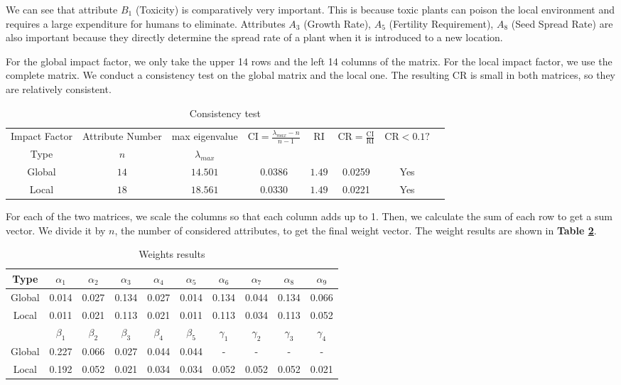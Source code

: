 \documentclass[12pt]{article}
\begin{document}
		We can see that attribute $B_1$ (Toxicity) is comparatively very important.  This is because toxic plants can poison the local environment and requires a large expenditure for humans to eliminate.  Attributes $A_3$ (Growth Rate), $A_5$ (Fertility Requirement), $A_8$ (Seed Spread Rate) are also important because they directly determine the spread rate of a plant when it is introduced to a new location.  
		
		For the global impact factor, we only take the upper 14 rows and the left 14 columns of the matrix.  For the local impact factor, we use the complete matrix.  We conduct a consistency test on the global matrix and the local one.  The resulting CR is small in both matrices, so they are relatively consistent.
		
		{
			\fontsize{10}{14}\selectfont
			{
				\begin{longtable}{cccccccc}
					\caption{Consistency test}
					\label{tb:consistency}\\
					
					\toprule
					Impact Factor&Attribute Number&max eigenvalue 
					&\multirow{2}{*}{$\mathrm{CI}=\displaystyle \frac{\lambda_{max}-n}{n-1}$}
					&\multirow{2}{*}{$\mathrm{RI}$}
					&\multirow{2}{*}{$\mathrm{CR}=\displaystyle \frac{\mathrm{CI}}{\mathrm{RI}}$}
					&\multirow{2}{*}{$\mathrm{CR}<0.1?$}\\
					Type&$n$&$\lambda_{max}$\\
					\toprule
					Global&$14$&$14.501$&$0.0386$&$1.49$&0.0259&Yes\\
					Local&$18$&$18.561$&$0.0330$&$1.49$&0.0221&Yes\\
					\bottomrule
				\end{longtable}
			}
		}	
		
		For each of the two matrices, we scale the columns so that each column adds up to 1.  Then, we calculate the sum of each row to get a sum vector.  We divide it by $n$, the number of considered attributes, to get the final weight vector.  The weight results are shown in \textbf{Table \ref{tb:weights}}.
	
		{
			\fontsize{10}{14}\selectfont
			{
				\begin{longtable}{c|ccccccccc}
					\caption{Weights results}
					\label{tb:weights}\\
					
					\toprule
					Type&$\alpha_1$&$\alpha_2$&$\alpha_3$&$\alpha_4$&$\alpha_5$&$\alpha_6$&$\alpha_7$&$\alpha_8$&$\alpha_9$\\
					\toprule
					Global&0.014&0.027&0.134&0.027&0.014&0.134&0.044&0.134&0.066\\
					Local&0.011&0.021&0.113&0.021&0.011&0.113&0.034&0.113&0.052\\
					\toprule
					\toprule
					&$\beta_1$&$\beta_2$&$\beta_3$&$\beta_4$&$\beta_5$&$\gamma_1$&$\gamma_2$&$\gamma_3$&$\gamma_4$\\
					\toprule
					Global&0.227&0.066&0.027&0.044&0.044&-&-&-&-\\
					Local&0.192&0.052&0.021&0.034&0.034&0.052&0.052&0.052&0.021\\
					\bottomrule
				\end{longtable}
			}
		}	
		
\end{document}
